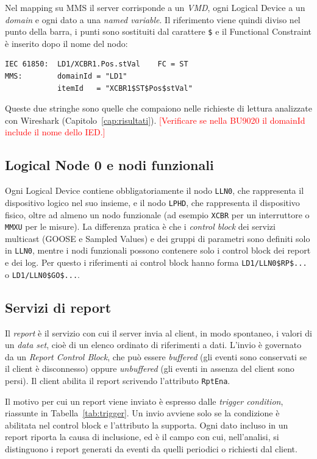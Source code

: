 \documentclass[11pt,a4paper,italian,oneside,openany]{book}
\begin{document}
Nel mapping su MMS il server corrisponde a un \textit{VMD}, ogni Logical Device a un \textit{domain} e ogni dato a una \textit{named variable}. Il riferimento viene quindi diviso nel punto della barra, i punti sono sostituiti dal carattere \texttt{\$} e il Functional Constraint è inserito dopo il nome del nodo:

\begin{lstlisting}[basicstyle=\ttfamily\small,frame=single]
IEC 61850:  LD1/XCBR1.Pos.stVal    FC = ST
MMS:        domainId = "LD1"
            itemId   = "XCBR1$ST$Pos$stVal"
\end{lstlisting}

Queste due stringhe sono quelle che compaiono nelle richieste di lettura analizzate con Wireshark (Capitolo~\ref{cap:risultati}).
\textcolor{red}{[Verificare se nella BU9020 il domainId include il nome dello IED.]}

\subsection{Logical Node 0 e nodi funzionali}
Ogni Logical Device contiene obbligatoriamente il nodo \texttt{LLN0}, che rappresenta il dispositivo logico nel suo insieme, e il nodo \texttt{LPHD}, che rappresenta il dispositivo fisico, oltre ad almeno un nodo funzionale (ad esempio \texttt{XCBR} per un interruttore o \texttt{MMXU} per le misure). La differenza pratica è che i \textit{control block} dei servizi multicast (GOOSE e Sampled Values) e dei gruppi di parametri sono definiti solo in \texttt{LLN0}, mentre i nodi funzionali possono contenere solo i control block dei report e dei log. Per questo i riferimenti ai control block hanno forma \texttt{LD1/LLN0\$RP\$...} o \texttt{LD1/LLN0\$GO\$...}.

\subsection{Servizi di report}
Il \textit{report} è il servizio con cui il server invia al client, in modo spontaneo, i valori di un \textit{data set}, cioè di un elenco ordinato di riferimenti a dati. L'invio è governato da un \textit{Report Control Block}, che può essere \textit{buffered} (gli eventi sono conservati se il client è disconnesso) oppure \textit{unbuffered} (gli eventi in assenza del client sono persi). Il client abilita il report scrivendo l'attributo \texttt{RptEna}.

Il motivo per cui un report viene inviato è espresso dalle \textit{trigger condition}, riassunte in Tabella~\ref{tab:trigger}. Un invio avviene solo se la condizione è abilitata nel control block e l'attributo la supporta. Ogni dato incluso in un report riporta la causa di inclusione, ed è il campo con cui, nell'analisi, si distinguono i report generati da eventi da quelli periodici o richiesti dal client.
\end{document}
